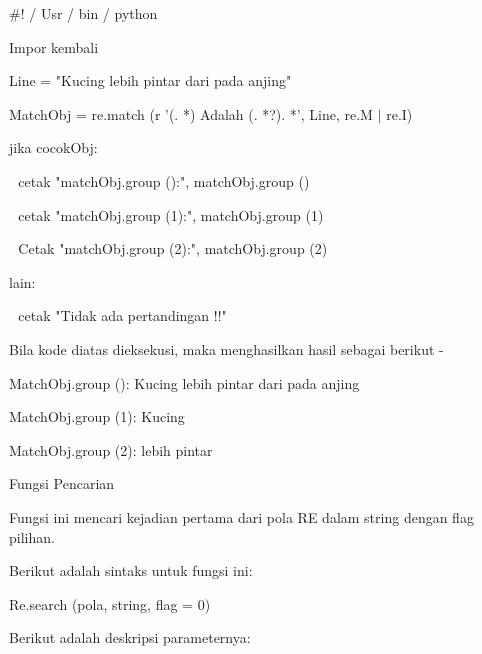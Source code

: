 \documentclass[a4paper,12pt]{report}
\begin{document}
\vspace{16pt}
\noindent 
 $  \#  $! / Usr / bin / python \par
\noindent 
Impor kembali \par
\vspace{12pt}
\noindent 
Line = "Kucing lebih pintar dari pada anjing" \par
\vspace{12pt}
\noindent 
MatchObj = re.match (r '(. *) Adalah (. *?). *', Line, re.M  $  \vert  $ re.I) \par
\vspace{12pt}
\noindent 
jika cocokObj: \par
\noindent 
 $  $ $  $ $  $cetak "matchObj.group ():", matchObj.group () \par
\noindent 
 $  $ $  $ $  $cetak "matchObj.group (1):", matchObj.group (1) \par
\noindent 
 $  $ $  $ $  $Cetak "matchObj.group (2):", matchObj.group (2) \par
\noindent 
lain: \par
\noindent 
 $  $ $  $ $  $cetak "Tidak ada pertandingan !!" \par
\vspace{12pt}
\noindent 
Bila kode diatas dieksekusi, maka menghasilkan hasil sebagai berikut - \par
\vspace{12pt}
\noindent 
MatchObj.group (): Kucing lebih pintar dari pada anjing \par
\noindent 
MatchObj.group (1): Kucing \par
\noindent 
MatchObj.group (2): lebih pintar \par
\vspace{12pt}
\noindent 
Fungsi Pencarian \par
\vspace{12pt}
\noindent 
Fungsi ini mencari kejadian pertama dari pola RE dalam string dengan flag pilihan. \par
\vspace{12pt}
\noindent 
Berikut adalah sintaks untuk fungsi ini: \par
\vspace{12pt}
\noindent 
Re.search (pola, string, flag = 0) \par
\vspace{12pt}
\noindent 
Berikut adalah deskripsi parameternya: \par


\end{document}
